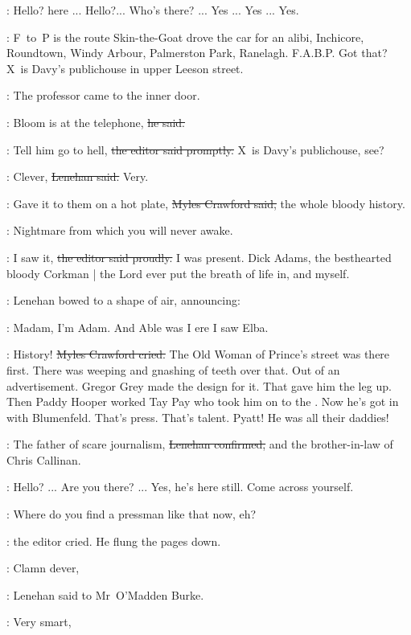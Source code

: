 \machugh:
Hello?
 here ...
Hello?...
Who's there? ...
Yes ...
Yes ...
Yes.

\crawford:
F~to~P is the route Skin-the-Goat drove the car for an alibi,
Inchicore, Roundtown, Windy Arbour, Palmerston Park, Ranelagh.
F.A.B.P.
Got that?
X~is Davy's publichouse in upper Leeson street.

:
The professor came to the inner door.

\machugh:
Bloom is at the telephone,
\sout{he said.}

\crawford:
Tell him go to hell,
\sout{the editor said promptly.}
X~is Davy's publichouse,
see?



\lenehan:
Clever,
\sout{Lenehan said.}
Very.

\crawford:
Gave it to them on a hot plate,
\sout{Myles Crawford said,}
the whole bloody history.

\StephenInt:
Nightmare from which you will never awake.

\crawford:
I saw it,
\sout{the editor said proudly.}
I was present.
Dick Adams, the besthearted bloody Corkman |
the Lord ever put the breath of life in,
and myself.

:
Lenehan bowed to a shape of air,
announcing:

\lenehan:
Madam,
I'm Adam.
And Able was I ere I saw Elba.

\crawford:
History!
\sout{Myles Crawford cried.}
The Old Woman of Prince's street was there first.
There was weeping and gnashing of teeth over that.
Out of an advertisement.
Gregor Grey made the design for it.
That gave him the leg up.
Then Paddy Hooper worked Tay Pay who took him on to the .
Now he's got in with Blumenfeld.
That's press.
That's talent.
Pyatt!
He was all their daddies!

\lenehan:
The father of scare journalism,
\sout{Lenehan confirmed,}
and the brother-in-law of Chris Callinan.

\machugh:
Hello? ...
Are you there? ...
Yes, he's here still.
Come across yourself.

\crawford:
Where do you find a pressman like that now, eh?

:
the editor cried.
He flung the pages down.

\lenehan:
Clamn dever,

:
Lenehan said to Mr~O'Madden Burke.

\omaddenburke:
Very smart,

